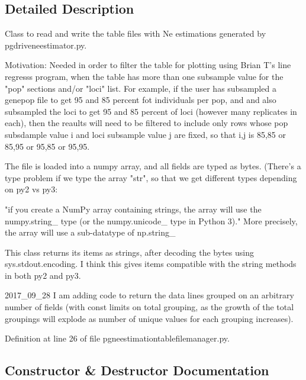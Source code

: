 \subsection{Detailed Description}
\begin{DoxyVerb}Class to read and write the table 
files with Ne estimations generated 
by pgdriveneestimator.py.

Motivation: Needed in order to filter the
table for plotting using Brian T's
line regresss program, when the table
has more than one subsample value for 
the "pop" sections and/or "loci" list. For example,
if the user has subsampled a genepop file
to get 95 and 85 percent fot individuals
per pop, and and also subsampled the loci
to get 95 and 85 percent of loci (however
many replicates in each), then the reaults
will need to be filtered to include only
rows whose pop subsdample value i and loci 
subsample value j are fixed, so that i,j
is 85,85 or 85,95 or 95,85 or 95,95.

The file is loaded into a numpy array,
and all fields are typed as bytes.
(There's a type problem if we type the array 
"str", so that  we get different types depending 
on py2 vs py3:

"if you create a NumPy array containing strings, 
the array will use the numpy.string_ type (or 
the numpy.unicode_ type in Python 3)." More precisely, 
the array will use a sub-datatype of np.string_

This class returns its items as strings, after
decoding the bytes using sys.stdout.encoding.
I think this gives items compatible with 
the string methods in both py2 and py3.


2017_09_28
I am adding code to return the data lines
grouped on an arbitrary number of fields
(with const limits on total grouping,
as the growth of the total 
groupings will explode as number of unique
values for each grouping increases).\end{DoxyVerb}
 

Definition at line 26 of file pgneestimationtablefilemanager.\+py.



\subsection{Constructor \& Destructor Documentation}
